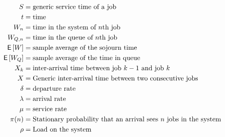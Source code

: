 \begin{align*}
  S &= \text{generic service time of a job} \\
  t &= \text{time} \\
  W_n &= \text{time in the system of $n$th job} \\
  W_{Q,n} &= \text{time in the queue of $n$th job} \\
  \,\mathsf{E}\left[W\right] &= \text{sample average of the sojourn time} \\
  \,\mathsf{E}\left[W_Q\right] &= \text{sample average of the time in queue} \\
  X_k &= \text{inter-arrival time between job $k-1$ and job  $k$} \\
  X &= \text{Generic inter-arrival time between two consecutive jobs} \\
  \delta &= \text{departure rate} \\
  \lambda &= \text{arrival rate} \\
  \mu &= \text{service rate} \\
  \pi(n)  &= \text{Stationary probability that an arrival sees $n$ jobs in the system} \\
  \rho &= \text{Load on the system} \\
\end{align*}
